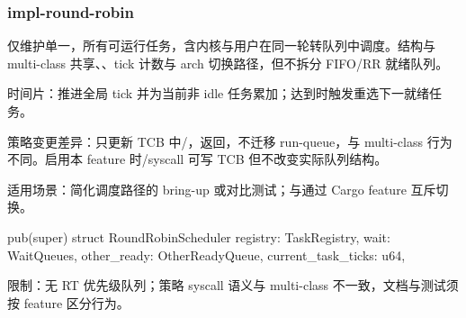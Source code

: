 
\subsubsection{impl-round-robin}

仅维护单一，所有可运行任务，含内核与用户在同一轮转队列中调度。结构与 multi-class 共享、、tick 计数与 arch 切换路径，但不拆分 FIFO/RR 就绪队列。

时间片：推进全局 tick 并为当前非 idle 任务累加；达到时触发重选下一就绪任务。

策略变更差异：只更新 TCB 中/，返回，不迁移 run-queue，与 multi-class 行为不同。启用本 feature 时/syscall 可写 TCB 但不改变实际队列结构。

适用场景：简化调度路径的 bring-up 或对比测试；与通过 Cargo feature 互斥切换。

\begin{rustcode}
pub(super) struct RoundRobinScheduler {
    registry: TaskRegistry,
    wait: WaitQueues,
    other_ready: OtherReadyQueue,
    current_task_ticks: u64,
}
\end{rustcode}

限制：无 RT 优先级队列；策略 syscall 语义与 multi-class 不一致，文档与测试须按 feature 区分行为。
